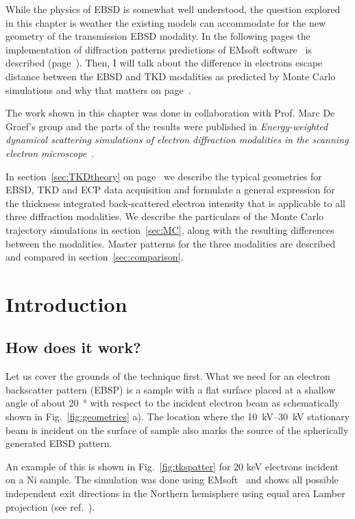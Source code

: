 While the physics of EBSD is somewhat well understood, the question explored in this chapter is weather the existing models can accommodate for the new geometry of the transmission EBSD modality. In the following pages the implementation of diffraction patterns predictions of EMsoft software~\cite{EMsoftpaper} is described (page~\pageref{sec:TKDtheory}). Then, I will talk about the difference in electrons escape distance between the EBSD and TKD modalities as predicted by Monte Carlo simulations and why that matters on page~\pageref{sec:MC}. 


The work shown in this chapter was done in collaboration with Prof. Marc De Graef's group and the parts of the results were published in \textit{Energy-weighted dynamical scattering simulations of electron diffraction modalities in the scanning electron microscope}~\cite{PascalTKD}.

In section~\ref{sec:TKDtheory} on page~\pageref{sec:TKDtheory} we describe the typical geometries for EBSD, TKD and ECP data acquisition and formulate a general expression for the thickness integrated back-scattered electron intensity that is applicable to all three diffraction modalities. We describe the particulars of the Monte Carlo trajectory simulations in section~\ref{sec:MC}, along with the resulting differences between the modalities. Master patterns for the three modalities are described and compared in section~\ref{sec:comparison}. 



\section{Introduction}

\subsection{How does it work?}
\label{sec:EBSD}

Let us cover the grounds of the technique first. What we need for an electron backscatter pattern (EBSP) is a sample with a flat surface placed at a shallow angle of about \SI{20}{\degree} with respect to the incident electron  beam as schematically shown in Fig.~\ref{fig:geometries} a). The location where the \SIrange{10}{30}{\kilo \volt} stationary beam is incident on  the surface of sample also marks the source of the spherically generated EBSD pattern. 

An example of this is shown in Fig.~\ref{fig:tkspatter} for 20 keV electrons incident on a Ni sample. The simulation was done using EMsoft~\cite{EMsoft} and shows all possible independent exit directions in the Northern hemisphere using equal area Lamber projection (see ref.~\cite{degraef2013e}). 

